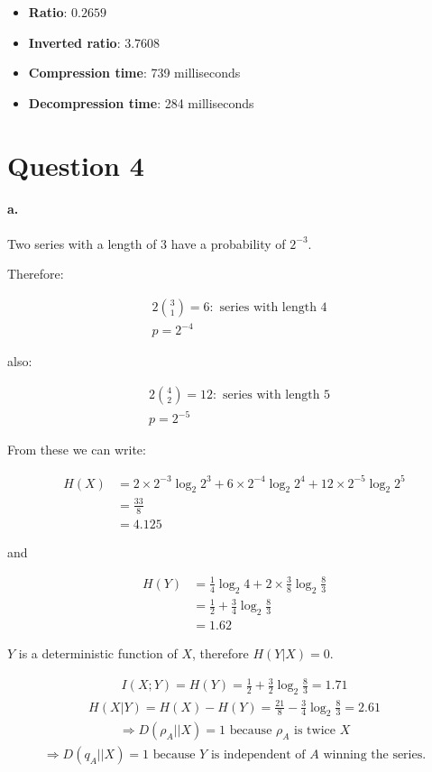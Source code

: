 \documentclass[fleqn]{article}
\begin{document}
\begin{itemize}
  \item \textbf{Ratio}: $0.2659$
  \item \textbf{Inverted ratio}: $3.7608$
  \item \textbf{Compression time}: 739 milliseconds
  \item \textbf{Decompression time}: 284 milliseconds
\end{itemize}


\section{Question 4}

\paragraph{a.}
Two series with a length of 3 have a probability of $2^{-3}$.

Therefore:

\begin{align*}
  &2 {3 \choose 1}=6 : \text{ series with length 4}\\
  &p=2^{-4}
\end{align*}

also:

\begin{align*}
  &2 {4 \choose 2}=12 : \text{ series with length 5}\\
  &p=2^{-5}
\end{align*}

From these we can write:

\begin{align*}
  H(X)&=2\times{}2^{-3}\log_2{2^3}+6\times{}2^{-4}\log_2{2^4}
  +12\times{}2^{-5}\log_2{2^5}\\
  &=\frac{33}{8}\\
  &=4.125
\end{align*}

and

\begin{align*}
  H(Y)&=\frac{1}{4}\log_2{4}+2\times{}\frac{3}{8}\log_2{\frac{8}{3}}\\
      &=\frac{1}{2}+\frac{3}{4}\log_2{\frac{8}{3}}\\
      &=1.62
\end{align*}

$Y$ is a deterministic function of $X$, therefore $H(Y|X)=0$.

\begin{align*}
  I(X;Y)=H(Y)=\frac{1}{2} + \frac{3}{2} \log_2{\frac{8}{3}}=1.71
\end{align*}
\begin{align*}
  H(X|Y)=H(X)-H(Y)=\frac{21}{8}-\frac{3}{4}\log_2{\frac{8}{3}}=2.61
\end{align*}
\begin{align*}
  \Rightarrow D(\rho_A||X)=1 \text{ because $\rho_A$ is twice $X$}
\end{align*}
\begin{align*}
  \Rightarrow D(q_A||X)=1 \text{ because $Y$ is independent of $A$ winning the series.}
\end{align*}
\end{document}
